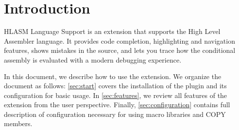 \section{Introduction}

HLASM Language Support is an extension that supports the High Level Assembler language. It provides code completion, highlighting and navigation features, shows mistakes in the source, and lets you trace how the conditional assembly is evaluated with a modern debugging experience.

In this document, we describe how to use the extension. We organize the document as follows: \cref{sec:start} covers the installation of the plugin and its configuration for basic usage. In \cref{sec:features}, we review all features of the extension from the user perspective. Finally, \cref{sec:configuration} contains full description of configuration necessary for using macro libraries and COPY members.
